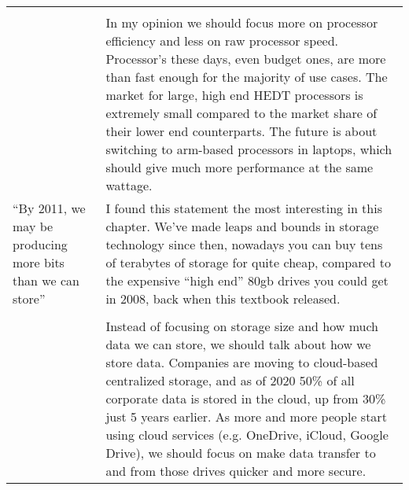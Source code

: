 \documentclass[11pt]{article}
\begin{document}
\begin{longtable}{|p{2cm}|p{8cm}|}
 & \\
 & In my opinion we should focus more on processor efficiency and less on raw processor speed. Processor's these days, even budget ones, are more than fast enough for the majority of use cases. The market for large, high end HEDT processors is extremely small compared to the market share of their lower end counterparts. The future is about switching to arm-based processors in laptops, which should give much more performance at the same wattage.\\
\hline
``By 2011, we may be producing more bits than we can store'' & I found this statement the most interesting in this chapter. We've made leaps and bounds in storage technology since then, nowadays you can buy tens of terabytes of storage for quite cheap, compared to the expensive ``high end'' 80gb drives you could get in 2008, back when this textbook released.\\
 & \\
 & Instead of focusing on storage size and how much data we can store, we should talk about how we store data. Companies are moving to cloud-based centralized storage, and as of 2020 50\% of all corporate data is stored in the cloud, up from 30\% just 5 years earlier. As more and more people start using cloud services (e.g. OneDrive, iCloud, Google Drive), we should focus on make data transfer to and from those drives quicker and more secure.\\
\hline
\end{longtable}
\end{document}
